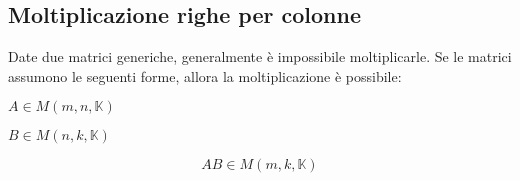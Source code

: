 \documentclass{article}
\begin{document}
\subsection{Moltiplicazione righe per colonne}

Date due matrici generiche, generalmente è impossibile moltiplicarle.
Se le matrici assumono le seguenti forme, allora la moltiplicazione è possibile:

\begin{description}
	\item $A \in M(m,n,\mathbb{K})$
	\item $B \in M(n,k,\mathbb{K})$
\end{description}

$$
AB \in M(m,k,\mathbb{K})
$$
\end{document}
